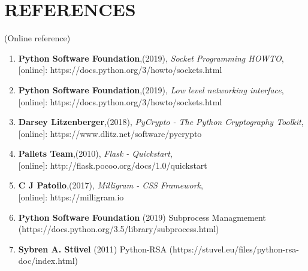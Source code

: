 \chapter*{\rm \large \bf REFERENCES}
\vspace{4.0mm}
\setlength{\parindent}{1cm} 

\scriptsize{(Online reference)}
\begin{enumerate}
    \item \textbf{Python Software Foundation},(2019),
        \textit{Socket Programming HOWTO},\\
        \hspace{15mm}[online]: https://docs.python.org/3/howto/sockets.html

    \item \textbf{Python Software Foundation},(2019),
        \textit{Low level networking interface},\\
        \hspace{15mm}[online]: https://docs.python.org/3/howto/sockets.html

    \item \textbf{Darsey Litzenberger},(2018),
        \textit{PyCrypto - The Python Cryptography Toolkit},\\
        \hspace{15mm}[online]: https://www.dlitz.net/software/pycrypto

    \item \textbf{Pallets Team},(2010),
        \textit{Flask - Quickstart},\\
        \hspace{15mm}[online]: http://flask.pocoo.org/docs/1.0/quickstart

    \item \textbf{C J Patoilo},(2017),
        \textit{Milligram - CSS Framework},\\
        \hspace{15mm}[online]: https://milligram.io

    \item \textbf{Python Software Foundation} (2019) Subprocess Managmement
        (https://docs.python.org/3.5/library/subprocess.html)

    \item \textbf{Sybren A. Stüvel} (2011) Python-RSA
        (https://stuvel.eu/files/python-rsa-doc/index.html)
\end{enumerate}

